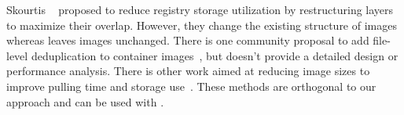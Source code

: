 Skourtis \etal~\cite{skourtis2019carving} proposed to reduce registry storage utilization by
restructuring layers to maximize their overlap. However, they change
the existing structure of images whereas \sysname leaves images unchanged.
%
%
%
There is one community proposal to add file-level deduplication to container
images~\cite{Krohmer-proposal}, but doesn't provide a detailed design or performance
analysis.
%
There is other work aimed at reducing image sizes to improve pulling time and 
storage use~\cite{cntr,rastogi2017cimplifier,gschwind2017optimizing,dockerslim}. 
%
These methods are orthogonal to our approach and can be used  with \sysname.
%
%
%
%
%
%
